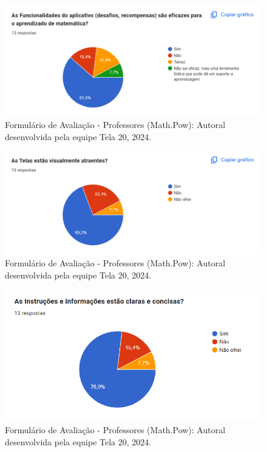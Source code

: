 \documentclass[12pt, openany, oneside, a4paper, english, brazil]{abntex2}   %
\begin{document}
\begin{figure}
    \centering
    \includegraphics{figuras/Formulário Gráficos/Professores/2 As funcinalidades do aplicativo.png}
    \caption{Formulário de Avaliação - Professores (Math.Pow):  Autoral desenvolvida pela equipe Tela 20, 2024.}
    \label{gráfico gerado pelo formulário}
\end{figure}

\begin{figure}
    \centering
    \includegraphics{figuras/Formulário Gráficos/Professores/3 As telas estao visualmente atraeentes.png}
    \caption{Formulário de Avaliação - Professores (Math.Pow):  Autoral desenvolvida pela equipe Tela 20, 2024.}
    \label{gráfico gerado pelo formulário}
\end{figure}

\begin{figure}
    \centering
    \includegraphics{figuras/Formulário Gráficos/Professores/4 Captura de tela 2024-12-10 103647.png}
    \caption{Formulário de Avaliação - Professores (Math.Pow):  Autoral desenvolvida pela equipe Tela 20, 2024.}
    \label{gráfico gerado pelo formulário}
\end{figure}
\end{document}
